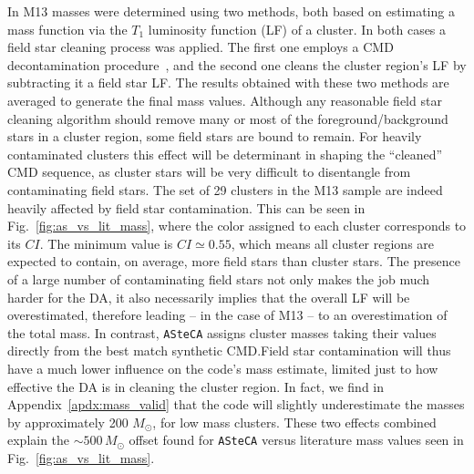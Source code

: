\documentclass[draft]{aa}
\begin{document}
In M13 masses were determined using two methods, both based on estimating
a mass function via the $T_1$ luminosity function (LF) of a cluster.
In both cases a field star cleaning process was applied. The first one employs
a CMD decontamination procedure~\citep{Maia_2010}, and the
second one cleans the cluster region's LF by subtracting it a field star LF.\@
The results obtained with these two methods are averaged to generate the final
mass values.
%
Although any reasonable field star cleaning algorithm should remove many or most
of the foreground/background stars in a cluster region, some field stars are
bound to remain.
For heavily contaminated clusters this effect will be determinant in shaping the
``cleaned'' CMD sequence, as cluster stars will be very difficult to
disentangle from contaminating field stars.
%
The set of 29 clusters in the M13 sample are indeed heavily affected by field
star contamination. This can be seen in Fig.~\ref{fig:as_vs_lit_mass}, where the
color assigned to each cluster corresponds to its $CI$. The minimum value is
$CI{\simeq}0.55$, which means all cluster regions are expected to contain, on
average, more field stars than cluster stars.
%
The presence of a large number of contaminating field stars not only makes the
job much harder for the DA, it also necessarily implies that the overall LF will
be overestimated, therefore leading -- in the case of M13 --  to an
overestimation of the total mass.
In contrast, \texttt{ASteCA} assigns cluster masses taking their values directly
from the best match synthetic CMD.\@ Field star contamination will thus have
a much lower influence on the code's mass estimate, limited just to how
effective the DA is in cleaning the cluster region. In fact, we find in
Appendix~\ref{apdx:mass_valid} that the code will slightly underestimate the
masses by approximately 200 $M_{\odot}$, for low mass clusters.
These two effects combined explain the ${\sim}500\,M_{\odot}$ offset found
for \texttt{ASteCA} versus literature mass values seen in
Fig.~\ref{fig:as_vs_lit_mass}.
\end{document}
